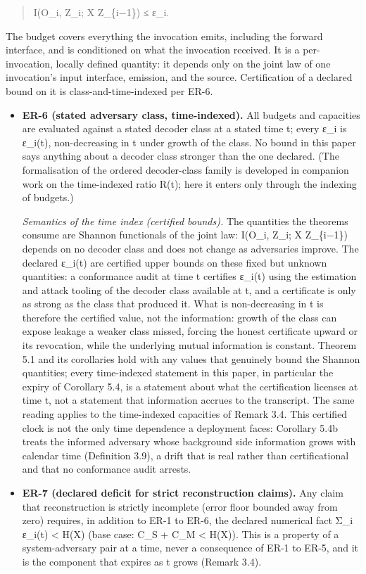 \documentclass[
  11pt,
]{article}
\begin{document}
\begin{quote}
I(O\_i, Z\_i; X \textbar{} Z\_\{i−1\}) ≤ ε\_i.
\end{quote}

The budget covers everything the invocation emits, including the forward
interface, and is conditioned on what the invocation received. It is a
per-invocation, locally defined quantity: it depends only on the joint
law of one invocation's input interface, emission, and the source.
Certification of a declared bound on it is class-and-time-indexed per
ER-6.

\begin{itemize}
\item
  \textbf{ER-6 (stated adversary class, time-indexed).} All budgets and
  capacities are evaluated against a stated decoder class at a stated
  time t; every ε\_i is ε\_i(t), non-decreasing in t under growth of the
  class. No bound in this paper says anything about a decoder class
  stronger than the one declared. (The formalisation of the ordered
  decoder-class family is developed in companion work on the
  time-indexed ratio R(t); here it enters only through the indexing of
  budgets.)

  \emph{Semantics of the time index (certified bounds).} The quantities
  the theorems consume are Shannon functionals of the joint law: I(O\_i,
  Z\_i; X \textbar{} Z\_\{i−1\}) depends on no decoder class and does
  not change as adversaries improve. The declared ε\_i(t) are certified
  upper bounds on these fixed but unknown quantities: a conformance
  audit at time t certifies ε\_i(t) using the estimation and attack
  tooling of the decoder class available at t, and a certificate is only
  as strong as the class that produced it. What is non-decreasing in t
  is therefore the certified value, not the information: growth of the
  class can expose leakage a weaker class missed, forcing the honest
  certificate upward or its revocation, while the underlying mutual
  information is constant. Theorem 5.1 and its corollaries hold with any
  values that genuinely bound the Shannon quantities; every time-indexed
  statement in this paper, in particular the expiry of Corollary 5.4, is
  a statement about what the certification licenses at time t, not a
  statement that information accrues to the transcript. The same reading
  applies to the time-indexed capacities of Remark 3.4. This certified
  clock is not the only time dependence a deployment faces: Corollary
  5.4b treats the informed adversary whose background side information
  grows with calendar time (Definition 3.9), a drift that is real rather
  than certificational and that no conformance audit arrests.
\item
  \textbf{ER-7 (declared deficit for strict reconstruction claims).} Any
  claim that reconstruction is strictly incomplete (error floor bounded
  away from zero) requires, in addition to ER-1 to ER-6, the declared
  numerical fact Σ\_i ε\_i(t) \textless{} H(X) (base case: C\_S + C\_M
  \textless{} H(X)). This is a property of a system-adversary pair at a
  time, never a consequence of ER-1 to ER-5, and it is the component
  that expires as t grows (Remark 3.4).
\end{itemize}
\end{document}
